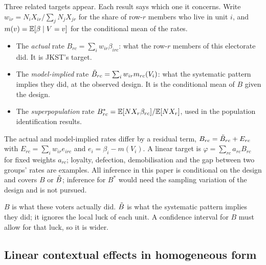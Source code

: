 Three related targets appear. Each result says which one it concerns. Write
$w_{ir}=N_iX_{ir}/\sum_jN_jX_{jr}$ for the share of row-$r$ members who live in
unit $i$, and $m(v)=\mathbb E[\beta\mid V=v]$ for the conditional mean of the rates.
\begin{itemize}
\item The \emph{actual} rate $B_{rc}=\sum_iw_{ir}\beta_{irc}$: what the row-$r$
members of this electorate did. It is JKST's target.
\item The \emph{model-implied} rate $\tilde B_{rc}=\sum_iw_{ir}m_{rc}(V_i)$: what the
systematic pattern implies they did, at the observed design. It is the
conditional mean of $B$ given the design.
\item The \emph{superpopulation} rate $B^*_{rc}=\mathbb E[NX_r\beta_{rc}]/\mathbb E[NX_r]$,
used in the population identification results.
\end{itemize}
The actual and model-implied rates differ by a residual term,
$B_{rc}=\tilde B_{rc}+E_{rc}$ with $E_{rc}=\sum_iw_{ir}e_{irc}$ and
$e_i=\beta_i-m(V_i)$. A linear target is $\varphi=\sum_{rc}a_{rc}B_{rc}$ for
fixed weights $a_{rc}$; loyalty, defection, demobilisation and the gap between
two groups' rates are examples. All inference in this paper is conditional on
the design and covers $B$ or $\tilde B$; inference for $B^*$ would need the
sampling variation of the design and is not pursued.

\begin{reading}
$B$ is what these voters actually did. $\tilde B$ is what the systematic pattern
implies they did; it ignores the local luck of each unit. A confidence interval
for $B$ must allow for that luck, so it is wider.
\end{reading}

\subsection{Linear contextual effects in homogeneous form}

